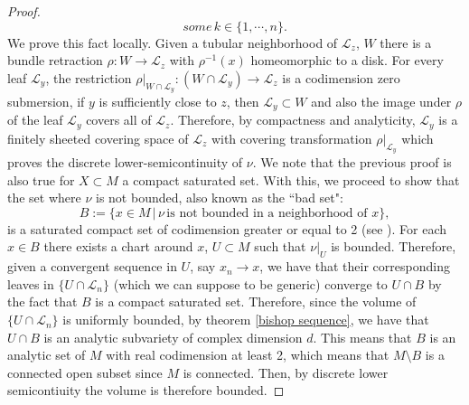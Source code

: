 \documentclass[12pt,twoside,a4paper]{report}
\newcommand{\nat}{\ensuremath{ \mathbb N }}
\newcommand{\sig}{\ensuremath{\Sigma}}
\begin{document}
\begin{proof}
$${some }\,k\in\lbrace 1,\cdots,n\rbrace.
$$
We prove this fact locally. Given a tubular neighborhood of $\mathcal{L}_z$,
$W$ there is a bundle retraction $\rho: W\rightarrow\mathcal{L}_z$ with $\rho^{-1}(x)$
homeomorphic to a disk. For every leaf $\mathcal{L}_y$, the restriction $\rho\vert_{W\cap\mathcal{L}_y}:(W\cap\mathcal{L}_y)\rightarrow\mathcal{L}_z$
is a codimension zero submersion, if $y$ is sufficiently close to $z$, then
$\mathcal{L}_y\subset W$ and also the image under $\rho$ of the leaf $\mathcal{L}_y$ covers all of $\mathcal{L}_z$.
Therefore, by compactness and analyticity, $\mathcal{L}_y$ is a finitely sheeted covering space of $\mathcal{L}_z$ with covering transformation
$\rho\vert_{\mathcal{L}_y}$ which proves the discrete lower-semicontinuity of $\nu$.
We note that the previous proof is also true for $X\subset M$ a compact saturated set.  With
this, we proceed to show that the set where $\nu$ is not bounded, also known as
the ``bad set":
$$
B:=\lbrace x\in M\,\vert\, \nu\,\text{is not bounded in a neighborhood of }x\rbrace,
$$
is a saturated compact set of codimension greater or equal to 2 (see \cite{Epstein}). For
each $x\in B$ there exists a chart around $x$, $U\subset M$ such that
$\nu\vert_U$ is bounded. Therefore, given a convergent sequence in $U$,
say $x_n\rightarrow x$, we have that their corresponding leaves in $\lbrace
U\cap\mathcal{L}_n\rbrace$ (which we can suppose to be generic) converge to
$U\cap B$ by the fact that $B$ is a compact saturated set. Therefore, since the
volume of $\lbrace U\cap\mathcal{L}_n\rbrace$ is uniformly bounded, by theorem
\ref{bishop sequence}, we have that $U \cap B$ is an analytic subvariety of
complex dimension $d$. This means that $B$ is an analytic set of $M$ with real
codimension at least 2, which means that $M\setminus B$ is a connected open
subset since $M$ is connected. Then, by discrete lower semicontiuity the volume is therefore bounded.



\end{proof}
\end{document}
